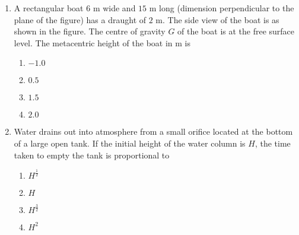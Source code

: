 \documentclass[journal]{IEEEtran}
\begin{document}
\begin{enumerate}[start=27]
    \item A rectangular boat $6$ m wide and $15$ m long (dimension perpendicular to the plane of the figure) has a draught of $2$ m. The side view of the boat is as shown in the figure. The centre of gravity $G$ of the boat is at the free surface level. The metacentric height of the boat in m is 
    \begin{figure}[H]
    \centering

    \label{fig:my_label}
    \end{figure}
    \begin{multicols}{4}
        \begin{enumerate}
            \item $-1.0$
            \item $0.5$
            \item $1.5$
            \item $2.0$
        \end{enumerate}
    \end{multicols}

    \item Water drains out into atmosphere from a small orifice located at the bottom of a large open tank. If the initial height of the water column is $H$, the time taken to empty the tank is proportional to
    \begin{multicols}{4}
        \begin{enumerate}
            \item $H^{\frac{1}{2}}$
            \item $H$
            \item $H^{\frac{3}{2}}$
            \item $H^{2}$
        \end{enumerate}
    \end{multicols}


\end{enumerate}
\end{document}
